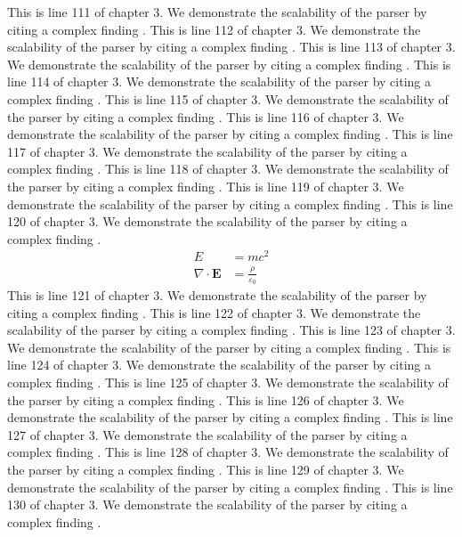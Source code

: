 This is line 111 of chapter 3. We demonstrate the scalability of the parser by citing a complex finding \cite{ref3_111}.
This is line 112 of chapter 3. We demonstrate the scalability of the parser by citing a complex finding \cite{ref3_112}.
This is line 113 of chapter 3. We demonstrate the scalability of the parser by citing a complex finding \cite{ref3_113}.
This is line 114 of chapter 3. We demonstrate the scalability of the parser by citing a complex finding \cite{ref3_114}.
This is line 115 of chapter 3. We demonstrate the scalability of the parser by citing a complex finding \cite{ref3_115}.
This is line 116 of chapter 3. We demonstrate the scalability of the parser by citing a complex finding \cite{ref3_116}.
This is line 117 of chapter 3. We demonstrate the scalability of the parser by citing a complex finding \cite{ref3_117}.
This is line 118 of chapter 3. We demonstrate the scalability of the parser by citing a complex finding \cite{ref3_118}.
This is line 119 of chapter 3. We demonstrate the scalability of the parser by citing a complex finding \cite{ref3_119}.
This is line 120 of chapter 3. We demonstrate the scalability of the parser by citing a complex finding \cite{ref3_120}.
\begin{align*}
  E &= mc^2 \\
  \nabla \cdot \mathbf{E} &= \frac{\rho}{\varepsilon_0}
\end{align*}
This is line 121 of chapter 3. We demonstrate the scalability of the parser by citing a complex finding \cite{ref3_121}.
This is line 122 of chapter 3. We demonstrate the scalability of the parser by citing a complex finding \cite{ref3_122}.
This is line 123 of chapter 3. We demonstrate the scalability of the parser by citing a complex finding \cite{ref3_123}.
This is line 124 of chapter 3. We demonstrate the scalability of the parser by citing a complex finding \cite{ref3_124}.
This is line 125 of chapter 3. We demonstrate the scalability of the parser by citing a complex finding \cite{ref3_125}.
This is line 126 of chapter 3. We demonstrate the scalability of the parser by citing a complex finding \cite{ref3_126}.
This is line 127 of chapter 3. We demonstrate the scalability of the parser by citing a complex finding \cite{ref3_127}.
This is line 128 of chapter 3. We demonstrate the scalability of the parser by citing a complex finding \cite{ref3_128}.
This is line 129 of chapter 3. We demonstrate the scalability of the parser by citing a complex finding \cite{ref3_129}.
This is line 130 of chapter 3. We demonstrate the scalability of the parser by citing a complex finding \cite{ref3_130}.
